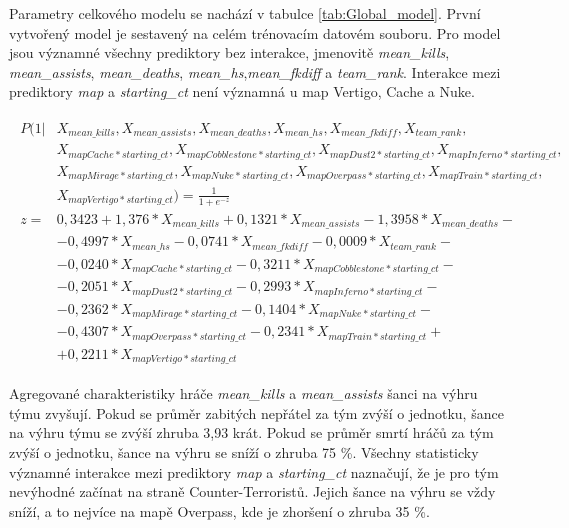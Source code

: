 

Parametry celkového modelu se nachází v tabulce \ref{tab:Global_model}. První vytvořený model je sestavený na celém trénovacím datovém souboru. Pro model jsou
významné všechny prediktory bez interakce, jmenovitě \textit{mean\_kills}, \textit{mean\_assists}, \textit{mean\_deaths}, \textit{mean\_hs},\textit{mean\_fkdiff} a
\textit{team\_rank}. Interakce mezi prediktory \textit{map} a \textit{starting\_ct} není významná u map Vertigo, Cache a Nuke.

\begin{align}
    \begin{split}
        P(1 | &X_{mean\_kills}, X_{mean\_assists}, X_{mean\_deaths}, X_{mean\_hs}, X_{mean\_fkdiff}, X_{team\_rank}, \\
              &X_{mapCache*starting\_ct}, X_{mapCobblestone*starting\_ct}, X_{mapDust2*starting\_ct}, X_{mapInferno*starting\_ct}, \\
              &X_{mapMirage*starting\_ct}, X_{mapNuke*starting\_ct}, X_{mapOverpass*starting\_ct}, X_{mapTrain*starting\_ct}, \\
              &X_{mapVertigo*starting\_ct}) = \frac{1}{1 + e^{-z}} \\
        z = &  0,3423 + 1,376*X_{mean\_kills} + 0,1321*X_{mean\_assists} - 1,3958*X_{mean\_deaths} - \\
            &- 0,4997*X_{mean\_hs} - 0,0741*X_{mean\_fkdiff} - 0,0009*X_{team\_rank} - \\
            &- 0,0240*X_{mapCache*starting\_ct} - 0,3211*X_{mapCobblestone*starting\_ct} - \\
            &- 0,2051*X_{mapDust2*starting\_ct} - 0,2993*X_{mapInferno*starting\_ct} - \\
            &- 0,2362*X_{mapMirage*starting\_ct} - 0,1404*X_{mapNuke*starting\_ct} - \\
            &- 0,4307*X_{mapOverpass*starting\_ct} - 0,2341*X_{mapTrain*starting\_ct} + \\
            &+ 0,2211*X_{mapVertigo*starting\_ct}
    \end{split}
\end{align}

Agregované charakteristiky hráče \textit{mean\_kills} a \textit{mean\_assists} šanci na výhru týmu zvyšují. Pokud se průměr zabitých nepřátel za tým zvýší o jednotku,
šance na výhru týmu se zvýší zhruba 3,93 krát. Pokud se průměr smrtí hráčů za tým zvýší o jednotku, šance na výhru se sníží o zhruba 75 \%. Všechny statisticky
významné interakce mezi prediktory \textit{map} a \textit{starting\_ct} naznačují, že je pro tým nevýhodné začínat na straně Counter-Terroristů. Jejich šance
na výhru se vždy sníží, a to nejvíce na mapě Overpass, kde je zhoršení o zhruba 35 \%. 

